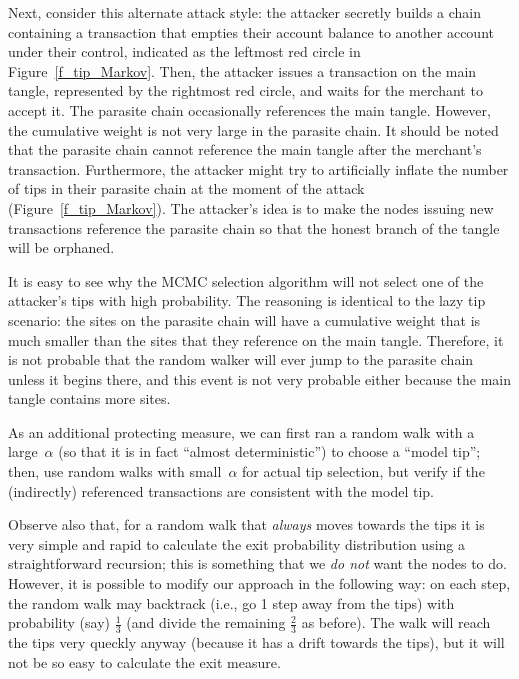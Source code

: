 \documentclass[12pt]{article}
\begin{document}
Next, consider this alternate attack style: the attacker secretly builds
a chain 
 containing a transaction that empties their account balance to 
another account under their control, indicated as the leftmost red
circle in Figure~\ref{f_tip_Markov}. Then, the attacker
issues a transaction on the main tangle, represented by the rightmost red circle,
and waits for the merchant to accept it. The parasite chain occasionally
references the main tangle. However, the cumulative weight is not very 
large in the parasite chain. It should be noted that the parasite chain cannot 
reference the main tangle after the merchant's transaction. Furthermore, 
the attacker might try to artificially
inflate the number of tips in their parasite chain 
at the moment of the attack (Figure~\ref{f_tip_Markov}).
The attacker's idea is to make the nodes issuing new transactions 
reference the parasite chain so that the honest branch of the tangle will
be orphaned.

It is easy to see why the MCMC selection algorithm
 will not select one of the attacker's tips with high probability.
The reasoning is identical to the lazy tip scenario:
 the sites on the parasite chain will
have a cumulative weight that is much smaller 
than the sites that they reference on the main tangle.
 Therefore, it is not probable that the random
walker will ever jump to the parasite chain unless it begins there,
and this event is not very probable either because the main tangle contains
more sites. 

As an additional protecting measure, we can 
first ran a random walk with a large~$\alpha$ (so that it is 
in fact ``almost deterministic'') to choose a 
 ``model tip''; then, use random walks with small~$\alpha$
for actual tip selection, but verify if the (indirectly)
referenced transactions are consistent with the model tip.

Observe also that,
for a random walk that \emph{always} moves towards the tips 
it is very simple and rapid to calculate the exit probability distribution using a straightforward recursion; this is something
that we \emph{do not} want the nodes to do. 
However, it is possible to modify our approach in the following
way: on each step, the random walk may
 backtrack (i.e., go 1 step away from the tips) 
with probability (say) $\frac{1}{3}$ 
(and divide the remaining $\frac{2}{3}$ as before). 
The walk will reach the tips very queckly anyway 
(because it has a drift towards the tips), 
but it will not be so easy to calculate the exit measure. 
\end{document}
